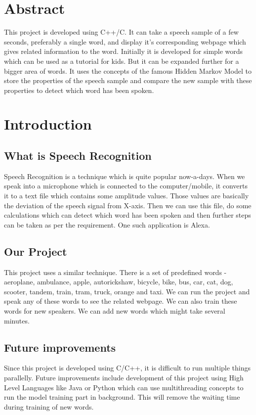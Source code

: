 \documentclass{article}
\begin{document}
\section{Abstract}
This project is developed using C++/C. It can take a speech sample of a few seconds, preferably a single word, and display it's corresponding webpage which gives related information to the word. Initially it is developed for simple words which can be used as a tutorial for kids. But it can be expanded further for a bigger area of words. It uses the concepts of the famous Hidden Markov Model to store the properties of the speech sample and compare the new sample with these properties to detect which word has been spoken.
\section{Introduction}
\subsection{What is Speech Recognition}
Speech Recognition is a technique which is quite popular now-a-days. When we speak into a microphone which is connected to the computer/mobile, it converts it to a text file which contains some amplitude values. Those values are basically the deviation of the speech signal from X-axis. Then we can use this file, do some calculations which can detect which word has been spoken and then further steps can be taken as per the requirement. One such application is Alexa.
\subsection{Our Project}
This project uses a similar technique. There is a set of predefined words - aeroplane, ambulance, apple, autorickshaw, bicycle, bike, bus, car, cat, dog, scooter, tandem, train, tram, truck, orange and taxi. We can run the project and speak any of these words to see the related webpage. We can also train these words for new speakers. We can add new words which might take several minutes.
\subsection{Future improvements}
Since this project is developed using C/C++, it is difficult to run multiple things parallelly. Future improvements include development of this project using High Level Languages like Java or Python which can use multithreading concepts to run the model training part in background. This will remove the waiting time during training of new words.
\end{document}

